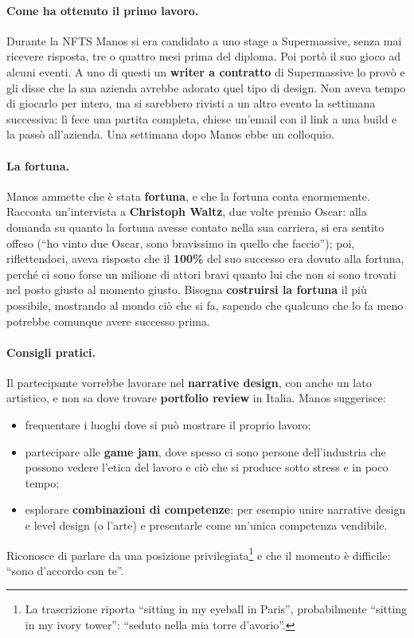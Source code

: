 \paragraph{Come ha ottenuto il primo lavoro.} Durante la NFTS Manos si era
candidato a uno stage a Supermassive, senza mai ricevere risposta, tre o quattro
mesi prima del diploma. Poi portò il suo gioco ad alcuni eventi. A uno di questi un
\textbf{writer a contratto} di Supermassive lo provò e gli disse che la sua azienda
avrebbe adorato quel tipo di design. Non aveva tempo di giocarlo per intero, ma si
sarebbero rivisti a un altro evento la settimana successiva: lì fece una partita
completa, chiese un'email con il link a una build e la passò all'azienda. Una
settimana dopo Manos ebbe un colloquio.

\paragraph{La fortuna.} Manos ammette che è stata \textbf{fortuna}, e che la
fortuna conta enormemente. Racconta un'intervista a \textbf{Christoph Waltz}, due
volte premio Oscar: alla domanda su quanto la fortuna avesse contato nella sua
carriera, si era sentito offeso (``ho vinto due Oscar, sono bravissimo in quello che
faccio''); poi, riflettendoci, aveva risposto che il \textbf{100\%} del suo
successo era dovuto alla fortuna, perché ci sono forse un milione di attori bravi
quanto lui che non si sono trovati nel posto giusto al momento giusto. Bisogna
\textbf{costruirsi la fortuna} il più possibile, mostrando al mondo ciò che si fa,
sapendo che qualcuno che lo fa meno potrebbe comunque avere successo prima.

\paragraph{Consigli pratici.} Il partecipante vorrebbe lavorare nel
\textbf{narrative design}, con anche un lato artistico, e non sa dove trovare
\textbf{portfolio review} in Italia. Manos suggerisce:
\begin{itemize}
  \item frequentare i luoghi dove si può mostrare il proprio lavoro;
  \item partecipare alle \textbf{game jam}, dove spesso ci sono persone
        dell'industria che possono vedere l'etica del lavoro e ciò che si produce
        sotto stress e in poco tempo;
  \item esplorare \textbf{combinazioni di competenze}: per esempio unire
        narrative design e level design (o l'arte) e presentarle come un'unica
        competenza vendibile.
\end{itemize}
Riconosce di parlare da una posizione privilegiata\footnote{La trascrizione
riporta ``sitting in my eyeball in Paris'', probabilmente ``sitting in my ivory
tower'': ``seduto nella mia torre d'avorio''.} e che il momento è difficile: ``sono
d'accordo con te''.

